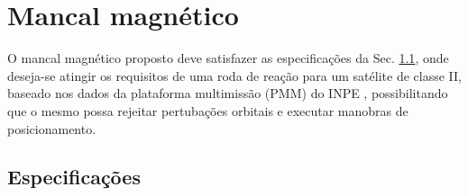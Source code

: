 \pagestyle{empty}
\cleardoublepage
\pagestyle{fancy}

\chapter{Mancal magnético}


O mancal magnético proposto deve satisfazer as especificações da Sec.  \ref{sec:especificações}, onde deseja-se atingir os requisitos de uma roda de reação para um satélite de classe II, baseado nos dados da plataforma multimissão (PMM) do INPE \citep{Veloso2009}, possibilitando que o mesmo possa rejeitar pertubações orbitais e executar manobras de posicionamento. 


\section{Especificações} \label{sec:especificações}

